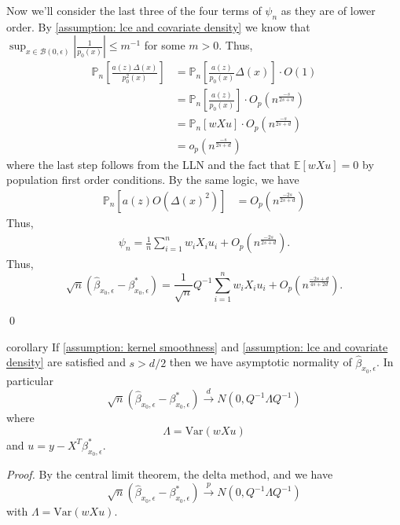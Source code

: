 \documentclass[11pt]{article}
\begin{document}
Now we'll consider the last three of the four terms of $\psi_n$ as they are of lower order. By \cref{assumption: lce and covariate density} we know that $\sup_{x\in \mathcal{B}(0, \epsilon)}\left|\frac{1}{p_0(x)}\right| \leq m^{-1}$ for some $m > 0$. Thus,
\begin{align*}
    \mathbb{P}_n\left[\frac{a(z)\Delta(x)}{p^2_0(x)}\right] &= \mathbb{P}_n\left[\frac{a(z)}{p_0(x)}\Delta(x)\right]\cdot O(1) \\
    &= \mathbb{P}_n\left[\frac{a(z)}{p_0(x)}\right]\cdot O_p\left(n^{\frac{-s}{2s+d}}\right) \\
    &= \mathbb{P}_n\left[wXu\right]\cdot O_p\left(n^{\frac{-s}{2s+d}}\right)\\
    &= o_p\left(n^{\frac{-s}{2s+d}}\right)
\end{align*}
where the last step follows from the LLN and the fact that $\mathbb{E}[wXu] = 0$ by population first order conditions. By the same logic, we have
\begin{align}
    \mathbb{P}_n\left[a(z)O\left(\Delta(x)^2\right)\right] &= O_p\left(n^{\frac{-2s}{2s+d}}\right)
\end{align}
Thus,
\begin{align}
    \psi_n = \frac{1}{n}\sum_{i = 1}^nw_iX_iu_i + O_p\left(n^{\frac{-2s}{2s+d}}\right).
\end{align}
Thus,
\begin{equation}
    \sqrt{n}\left(\hat{\beta}_{x_0, \epsilon} - \beta^*_{x_0, \epsilon}\right) = \frac{1}{\sqrt{n}}Q^{-1}\sum_{i = 1}^nw_iX_iu_i +O_p\left(n^{\frac{-2s+d}{4s+2d}}\right). 
\end{equation}

\qed{}

\begin{restatable}{corollary}{} \label{thm: central limit for beta}
    If \cref{assumption: kernel smoothness} and \cref{assumption: lce and covariate density} are satisfied and $s > d/2$ then we have asymptotic normality of $\hat{\beta}_{x_0,\epsilon}$. In particular
    \[\sqrt{n}(\hat{\beta}_{x_0, \epsilon} - \beta^*_{x_0, \epsilon}) \overset{d}{\rightarrow} N(0, Q^{-1}\Lambda Q^{-1})\]
    where 
    \[\Lambda = \text{Var}(wXu)\]
    and $u = y - X^T\beta_{x_0, \epsilon}^*$.
\end{restatable}
\noindent\textit{Proof.} By the central limit theorem, the delta method, and  we have
\begin{equation}
     \sqrt{n}(\hat{\beta}_{x_0, \epsilon} - \beta_{x_0, \epsilon}^*) \overset{p}{\rightarrow} N(0, Q^{-1}\Lambda Q^{-1})
\end{equation}
with $\Lambda = \text{Var}(wXu)$. 
\end{document}
